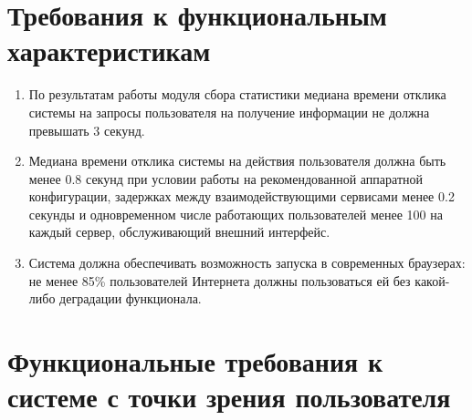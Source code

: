 \section*{Требования к функциональным характеристикам}
\begin{enumerate}
	\item По результатам работы модуля сбора статистики медиана времени отклика системы на запросы пользователя на получение информации не должна превышать 3 секунд.
	
	\item Медиана времени отклика системы на действия пользователя должна быть менее 0.8 секунд при условии работы на рекомендованной аппаратной конфигурации, задержках между взаимодействующими сервисами менее 0.2 секунды и одновременном числе работающих пользователей менее 100 на каждый сервер, обслуживающий внешний интерфейс.
	
	\item Система должна обеспечивать возможность запуска в современных браузерах: не менее 85\% пользователей Интернета должны пользоваться ей без какой-либо деградации функционала.
\end{enumerate}

\section*{Функциональные требования к системе с точки зрения пользователя}

